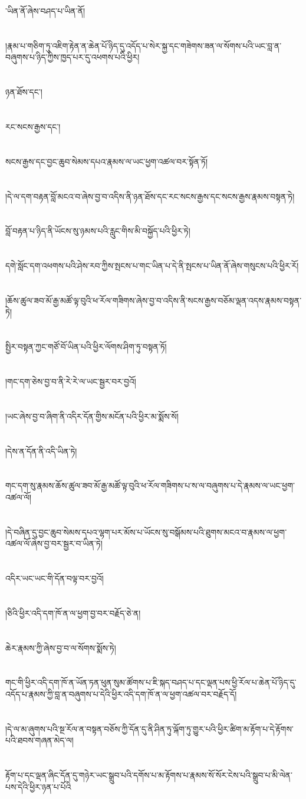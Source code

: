 ་ཡིན་ནོ་ཞེས་བཤད་པ་ཡིན་ནོ།\chapter{ }།རྣམ་པ་གཅིག་ཏུ་འཇིག་རྟེན་ན་ཆེན་པོ་ཉིད་དུ་འདོད་པ་སེར་སྐྱ་དང་གཟེགས་ཟན་ལ་སོགས་པའི་ཡང་བླ་ན་བཞུགས་པ་ཉིད་ཀྱིས་ཁྱད་པར་དུ་འཕགས་པའི་ཕྱིར།\chapter{ }ཉན་ཐོས་དང་།\chapter{ }རང་སངས་རྒྱས་དང་།\chapter{ }སངས་རྒྱས་དང་བྱང་ཆུབ་སེམས་དཔའ་རྣམས་ལ་ཡང་ཕྱག་འཚལ་བར་སྟོན་ཏོ།\chapter{ }།དེ་ལ་དག་བརྟན་བློ་མངའ་བ་ཞེས་བྱ་བ་འདིས་ནི་ཉན་ཐོས་དང་རང་སངས་རྒྱས་དང་སངས་རྒྱས་རྣམས་བསྟན་ཏེ།\chapter{ }བློ་བརྟན་པ་ཉིད་ནི་ཡོངས་སུ་ཉམས་པའི་རླུང་གིས་མི་བསྐྱོད་པའི་ཕྱིར་ཏེ།\chapter{ }དགེ་སློང་དག་འཕགས་པའི་ཤེས་རབ་ཀྱིས་སྤངས་པ་གང་ཡིན་པ་དེ་ནི་སྤངས་པ་ཡིན་ནོ་ཞེས་གསུངས་པའི་ཕྱིར་རོ།\chapter{ }།ཆོས་ཚུལ་ཟབ་མོ་རྒྱ་མཚོ་ལྟ་བུའི་ཕ་རོལ་གཟིགས་ཞེས་བྱ་བ་འདིས་ནི་སངས་རྒྱས་བཅོམ་ལྡན་འདས་རྣམས་བསྟན་ཏེ།\chapter{ }སྤྱིར་བསྟན་ཀྱང་གཙོ་བོ་ཡིན་པའི་ཕྱིར་ལོགས་ཤིག་ཏུ་བསྟན་ཏོ།\chapter{ }།གང་དག་ཅེས་བྱ་བ་ནི་རེ་རེ་ལ་ཡང་སྦྱར་བར་བྱའོ།\chapter{ }།ཡང་ཞེས་བྱ་བ་ཞིག་ནི་འདིར་དོན་གྱིས་མངོན་པའི་ཕྱིར་མ་སྨོས་སོ།\chapter{ }།དེས་ན་དོན་ནི་འདི་ཡིན་ཏེ།\chapter{ }གང་དག་སུ་རྣམས་ཆོས་ཚུལ་ཟབ་མོ་རྒྱ་མཚོ་ལྟ་བུའི་ཕ་རོལ་གཟིགས་པ་ས་ལ་བཞུགས་པ་དེ་རྣམས་ལ་ཡང་ཕྱག་འཚལ་ལོ།\chapter{ }།དེ་བཞིན་དུ་བྱང་ཆུབ་སེམས་དཔའ་ལྷག་པར་མོས་པ་ཡོངས་སུ་བསྒོམས་པའི་ཐུགས་མངའ་བ་རྣམས་ལ་ཕྱག་འཚལ་ལོ་ཞེས་བྱ་བར་སྦྱར་བ་ཡིན་ཏེ།\chapter{ }འདིར་ཡང་ཡང་གི་དོན་བལྟ་བར་བྱའོ།\chapter{ }།ཅིའི་ཕྱིར་འདི་དག་ཁོ་ན་ལ་ཕྱག་བྱ་བར་བརྗོད་ཅེ་ན།\chapter{ }ཆེར་རྣམས་ཀྱི་ཞེས་བྱ་བ་ལ་སོགས་སྨོས་ཏེ།\chapter{ }གང་གི་ཕྱིར་འདི་དག་ཁོ་ན་ཡོན་ཏན་ཕུན་སུམ་ཚོགས་པ་ཇི་སྐད་བཤད་པ་དང་ལྡན་པས་ཕྱི་རོལ་པ་ཆེན་པོ་ཉིད་དུ་འདོད་པ་རྣམས་ཀྱི་བླ་ན་བཞུགས་པ་དེའི་ཕྱིར་འདི་དག་ཁོ་ན་ལ་ཕྱག་འཚལ་བར་བརྗོད་དོ།\chapter{ }།དེ་ལ་མ་ཞུགས་པའི་སྔ་རོལ་ན་བསྟན་བཅོས་ཀྱི་དོན་དུ་ནི་ཤིན་ཏུ་ལྐོག་ཏུ་གྱུར་པའི་ཕྱིར་ཚིག་མ་རྟོག་པ་དེ་རྟོགས་པའི་ཐབས་གཞན་མེད་ལ།\chapter{ }རྟོག་པ་དང་ལྡན་ཞིང་དོན་དུ་གཉེར་ཡང་སྒྲུབ་པའི་དགོས་པ་མ་རྟོགས་པ་རྣམས་སོ་སོར་ངེས་པའི་སྒྲུབ་པ་མི་ལེན་པས་དེའི་ཕྱིར་ཉན་པ་པོའི